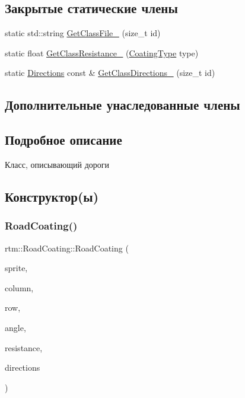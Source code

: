 \subsection*{Закрытые статические члены}
\begin{DoxyCompactItemize}
\item 
static std\+::string \hyperlink{classrtm_1_1_road_coating_a9d5c3606637d915de03eeeba53435b98}{Get\+Class\+File\+\_\+} (size\+\_\+t id)
\item 
static float \hyperlink{classrtm_1_1_road_coating_ac5bb86996945090417532dd5af056a24}{Get\+Class\+Resistance\+\_\+} (\hyperlink{namespacertm_aecd3929e64cd461eb3555b611f6fad95}{Coating\+Type} type)
\item 
static \hyperlink{namespacertm_a4776fbfe59834ff1a16838ad6735b69a}{Directions} const  \& \hyperlink{classrtm_1_1_road_coating_ae95e308d1f3998967ca420fa83f2bd93}{Get\+Class\+Directions\+\_\+} (size\+\_\+t id)
\end{DoxyCompactItemize}
\subsection*{Дополнительные унаследованные члены}


\subsection{Подробное описание}
Класс, описывающий дороги 

\subsection{Конструктор(ы)}
\mbox{\label{classrtm_1_1_road_coating_a3daed8c05e6901a8e2aedd5bd8b10e88}} 
\subsubsection{\texorpdfstring{Road\+Coating()}{RoadCoating()}\hspace{0.1cm}{\footnotesize\ttfamily [1/3]}}
{\footnotesize\ttfamily rtm\+::\+Road\+Coating\+::\+Road\+Coating (\begin{DoxyParamCaption}\item[{cocos2d\+::\+Sprite $\ast$const}]{sprite,  }\item[{int}]{column,  }\item[{int}]{row,  }\item[{\hyperlink{namespacertm_a69dc82b16a0148c10962caa83d930f89}{Angle\+Type}}]{angle,  }\item[{float}]{resistance,  }\item[{\hyperlink{namespacertm_a4776fbfe59834ff1a16838ad6735b69a}{Directions}}]{directions }\end{DoxyParamCaption})}

